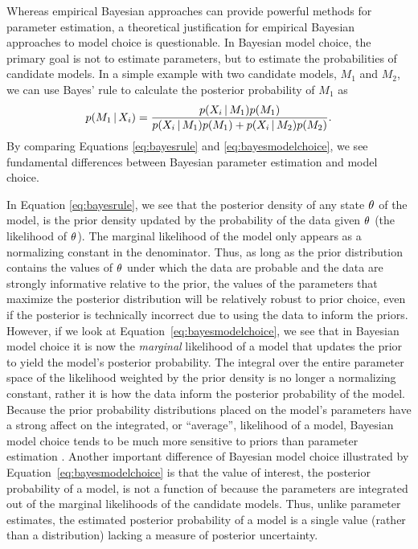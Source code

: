 \begin{linenomath}
Whereas empirical Bayesian approaches can provide powerful methods for
parameter estimation, a theoretical justification for empirical Bayesian
approaches to model choice is questionable.
In Bayesian model choice, the primary goal is not to estimate parameters, but
to estimate the probabilities of candidate models.
In a simple example with two candidate models, $M_1$ and $M_2$, we can use
Bayes' rule to calculate the posterior probability of $M_1$ as
\begin{equation}
    p(M_1 \given \alignment{i}{}) = \frac{p(\alignment{i}{} \given
    M_1)p(M_1)}{p(\alignment{i}{} \given M_1)p(M_1) + p(\alignment{i}{} \given
    M_2)p(M_2)}.
    \label{eq:bayesmodelchoice}
\end{equation}
By comparing Equations \ref{eq:bayesrule} and \ref{eq:bayesmodelchoice}, we
see fundamental differences between Bayesian parameter estimation and
model choice.
\end{linenomath}

In Equation \ref{eq:bayesrule}, we see that the posterior density of any state
$\theta_{}$ of the model, is the prior density updated by the probability of
the data given $\theta_{}$ (the likelihood of $\theta_{}$).
The marginal likelihood of the model only appears as a normalizing constant in
the denominator.
Thus, as long as the prior distribution contains the values of $\theta_{}$
under which the data are probable and the data are strongly informative
relative to the prior, the values of the parameters that maximize the posterior
distribution will be relatively robust to prior choice, even if the posterior
is technically incorrect due to using the data to inform the priors.
However, if we look at Equation~\ref{eq:bayesmodelchoice}, we see that in
Bayesian model choice it is now the \emph{marginal} likelihood of a model that
updates the prior to yield the model's posterior probability.
The integral over the entire parameter space of the likelihood weighted by the
prior density is no longer a normalizing constant, rather it is how the data
inform the posterior probability of the model.
Because the prior probability distributions placed on the model's parameters
have a strong affect on the integrated, or ``average'', likelihood of a model,
Bayesian model choice tends to be much more sensitive to priors than parameter
estimation \citep{Jeffreys1939,Lindley1957}.
Another important difference of Bayesian model choice illustrated by
Equation~\ref{eq:bayesmodelchoice} is that the value of interest, the posterior
probability of a model, is not a function of \myTheta{} because the parameters
are integrated out of the marginal likelihoods of the candidate models.
Thus, unlike parameter estimates, the estimated posterior probability of a
model is a single value (rather than a distribution) lacking a measure of
posterior uncertainty.

